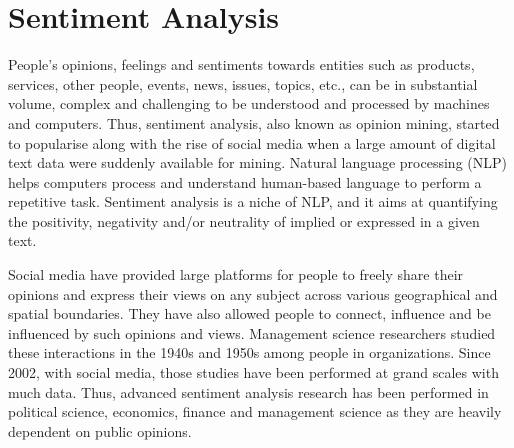 \chapter{Sentiment Analysis}
People's opinions, feelings and sentiments towards entities such as products, services, other people, events, news, issues, topics, etc., can be in substantial volume, complex and challenging to be understood and processed by machines and computers. Thus, sentiment analysis, also known as opinion mining, started to popularise along with the rise of social media when a large amount of digital text data were suddenly available for mining. Natural language processing (NLP) helps computers process and understand human-based language to perform a repetitive task. Sentiment analysis is a niche of NLP, and it aims at quantifying the positivity, negativity and/or neutrality of implied or expressed in a given text.

Social media have provided large platforms for people to freely share their opinions and express their views on any subject across various geographical and spatial boundaries. They have also allowed people to connect, influence and be influenced by such opinions and views. Management science researchers studied these interactions in the 1940s and 1950s among people in organizations. Since 2002, with social media, those studies have been performed at grand scales with much data. Thus, advanced sentiment analysis research has been performed in political science, economics, finance and management science as they are heavily dependent on public opinions. 

